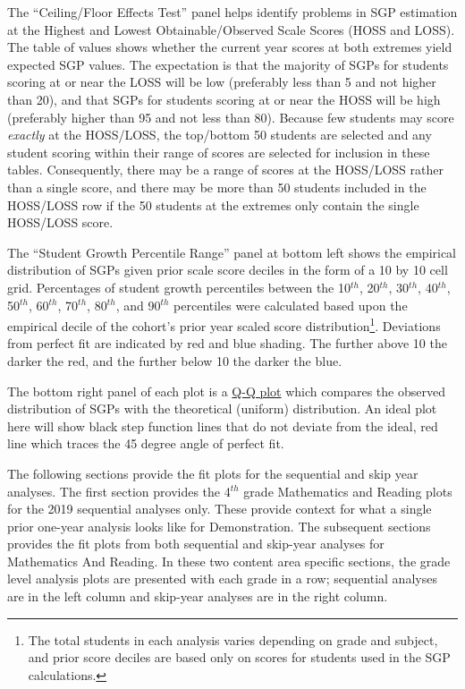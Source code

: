 \documentclass[12pt]{article}
\begin{document}
The ``Ceiling/Floor Effects Test'' panel helps identify problems in SGP
estimation at the Highest and Lowest Obtainable/Observed Scale Scores
(HOSS and LOSS). The table of values shows whether the current year
scores at both extremes yield expected SGP values. The expectation is
that the majority of SGPs for students scoring at or near the LOSS will
be low (preferably less than 5 and not higher than 20), and that SGPs
for students scoring at or near the HOSS will be high (preferably higher
than 95 and not less than 80). Because few students may score
\emph{exactly} at the HOSS/LOSS, the top/bottom 50 students are selected
and any student scoring within their range of scores are selected for
inclusion in these tables. Consequently, there may be a range of scores
at the HOSS/LOSS rather than a single score, and there may be more than
50 students included in the HOSS/LOSS row if the 50 students at the
extremes only contain the single HOSS/LOSS score.

The ``Student Growth Percentile Range'' panel at bottom left shows the
empirical distribution of SGPs given prior scale score deciles in the
form of a 10 by 10 cell grid. Percentages of student growth percentiles
between the 10\(^{th}\), 20\(^{th}\), 30\(^{th}\), 40\(^{th}\),
50\(^{th}\), 60\(^{th}\), 70\(^{th}\), 80\(^{th}\), and 90\(^{th}\)
percentiles were calculated based upon the empirical decile of the
cohort's prior year scaled score distribution\footnote{The total
  students in each analysis varies depending on grade and subject, and
  prior score deciles are based only on scores for students used in the
  SGP calculations.}. Deviations from perfect fit are indicated by red
and blue shading. The further above 10 the darker the red, and the
further below 10 the darker the blue.

The bottom right panel of each plot is a
\href{https://en.wikipedia.org/wiki/Q\%E2\%80\%93Q_plot}{Q-Q plot} which
compares the observed distribution of SGPs with the theoretical
(uniform) distribution. An ideal plot here will show black step function
lines that do not deviate from the ideal, red line which traces the 45
degree angle of perfect fit.

The following sections provide the fit plots for the sequential and skip
year analyses. The first section provides the 4\(^{th}\) grade
Mathematics and Reading plots for the 2019 sequential analyses only.
These provide context for what a single prior one-year analysis looks
like for Demonstration. The subsequent sections provides the fit plots
from both sequential and skip-year analyses for Mathematics And Reading.
In these two content area specific sections, the grade level analysis
plots are presented with each grade in a row; sequential analyses are in
the left column and skip-year analyses are in the right column.
\end{document}
